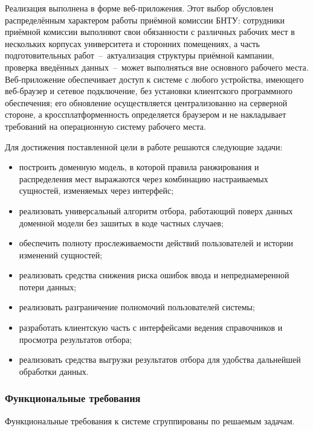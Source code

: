 Реализация выполнена в форме веб-приложения.
Этот выбор обусловлен распределённым характером работы приёмной комиссии БНТУ: сотрудники приёмной комиссии выполняют свои обязанности с различных рабочих мест в нескольких корпусах университета и сторонних помещениях, а часть подготовительных работ~--~актуализация структуры приёмной кампании, проверка введённых данных~--~может выполняться вне основного рабочего места.
Веб-приложение обеспечивает доступ к системе с любого устройства, имеющего веб-браузер и сетевое подключение, без установки клиентского программного обеспечения; его обновление осуществляется централизованно на серверной стороне, а кроссплатформенность определяется браузером и не накладывает требований на операционную систему рабочего места.

Для достижения поставленной цели в работе решаются следующие задачи:
\begin{itemize}
\item построить доменную модель, в которой правила ранжирования и распределения мест выражаются через комбинацию настраиваемых сущностей, изменяемых через интерфейс;
\item реализовать универсальный алгоритм отбора, работающий поверх данных доменной модели без зашитых в коде частных случаев;
\item обеспечить полноту прослеживаемости действий пользователей и истории изменений сущностей;
\item реализовать средства снижения риска ошибок ввода и непреднамеренной потери данных;
\item реализовать разграничение полномочий пользователей системы;
\item разработать клиентскую часть с интерфейсами ведения справочников и просмотра результатов отбора;
\item реализовать средства выгрузки результатов отбора для удобства дальнейшей обработки данных.
\end{itemize}

\subsubsection{Функциональные требования}

Функциональные требования к системе сгруппированы по решаемым задачам.

